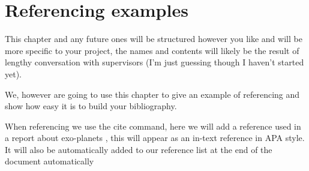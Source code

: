\documentclass[../main.tex]{subfiles}
\begin{document}
\section{Referencing examples}

This chapter and any future ones will be structured however you like and will be more specific to your project, the names and contents will likely be the result of lengthy conversation with supervisors (I'm just guessing though I haven't started yet).

We, however are going to use this chapter to give an example of referencing and show how easy it is to build your bibliography.

When referencing we use the cite{} command, here we will add a reference used in a report about exo-planets \cite{fulton_california-kepler_2017}, this will appear as an in-text reference in APA style. It will also be automatically added to our reference list at the end of the document automatically
\end{document}
